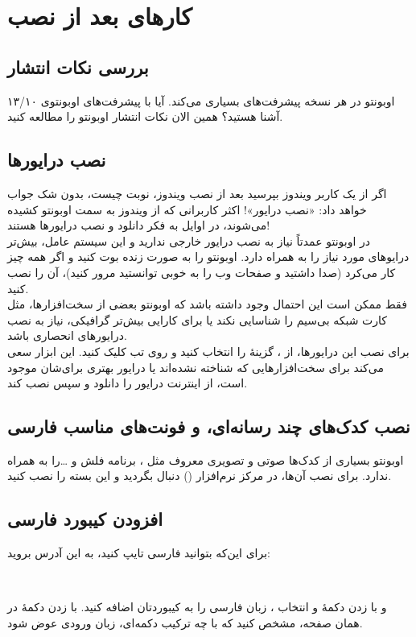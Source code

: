 \chapter{کارهای بعد از نصب}
\section{بررسی نکات انتشار}
 اوبونتو در هر نسخه پیشرفت‌های بسیاری می‌کند. آیا با پیشرفت‌های اوبونتوی ۱۳/۱۰ آشنا هستید؟ همین الان نکات انتشار اوبونتو را مطالعه کنید.

\section{نصب درایورها}
اگر از یک کاربر ویندوز بپرسید بعد از نصب ویندوز، نوبت چیست، بدون شک جواب خواهد داد: «نصب درایور»! اکثر کاربرانی که از ویندوز به سمت اوبونتو کشیده می‌شوند، در اوایل به فکر دانلود و نصب درایورها هستند!\\
در اوبونتو عمدتاً نیاز به نصب درایور خارجی ندارید و این سیستم عامل، بیش‌تر درایوهای مورد نیاز را به همراه دارد. اوبونتو را به صورت زنده بوت کنید و اگر همه چیز کار می‌کرد (صدا داشتید و صفحات وب را به خوبی توانستید مرور کنید)، آن را نصب کنید.\\
فقط ممکن است این احتمال وجود داشته باشد که اوبونتو بعضی از سخت‌افزارها، مثل کارت شبکه بی‌سیم را شناسایی نکند یا برای کارایی بیش‌تر گرافیکی، نیاز به نصب درایورهای انحصاری باشد.\\
برای نصب این درایورها، از ، گزینهٔ  را انتخاب کنید و روی تب  کلیک کنید. این ابزار سعی می‌کند برای سخت‌افزارهایی که شناخته نشده‌اند یا درایور بهتری برای‌شان موجود است، از اینترنت درایور را دانلود و سپس نصب کند.

\section[نصب کدک‌های چند رسانه‌ای، Flash Adobe و فونت‌های مناسب فارسی]{نصب کدک‌های چند رسانه‌ای،  و فونت‌های مناسب فارسی}
اوبونتو بسیاری از کدک‌ها صوتی و تصویری معروف مثل ، برنامه فلش و \ldots را به همراه ندارد. برای نصب آن‌ها، در مرکز نرم‌افزار () دنبال  بگردید و این بسته را نصب کنید.

\section{افزودن کیبورد فارسی}
برای این‌که بتوانید فارسی تایپ کنید، به این آدرس بروید:
\begin{flushleft}
\\
\end{flushleft}
و با زدن دکمهٔ \lr{+} و انتخاب ، زبان فارسی را به کیبوردتان اضافه کنید. با زدن دکمهٔ  در همان صفحه، مشخص کنید که با چه ترکیب دکمه‌ای، زبان ورودی عوض شود.
